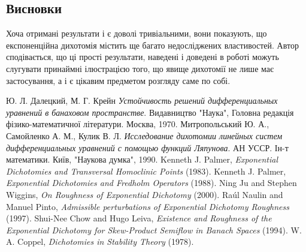 \documentclass{SHVpaper}
\begin{document}
\subsection{Висновки}
Хоча отримані результати і є доволі тривіальними, вони показують, що експоненційна дихотомія містить ще багато недосліджених 
властивостей. Автор сподівається, що ці прості результати, наведені і доведені в роботі можуть слугувати принаймні ілюстрацією того, що
явище дихотомії не лише має застосування, а і є цікавим предметом розгляду саме по собі.
\begin{thebibliography}{9}
Ю. Л. Далецкий, М. Г. Крейн
\emph{Устойчивость решений дифференциальных уравнений в банаховом пространстве}.
Видавництво "Наука"{}, Головна редакція фізико-математичної літератури. Москва, 1970.
Митропольський Ю. А., Самойленко А. М., Кулик В. Л.
\emph{Исследование дихотомии линейных систем дифференциальных уравнений с помощью функций Ляпунова}.
АН УССР. Ін-т математики. Київ, "Наукова думка", 1990.
	Kenneth J. Palmer, {\em Exponential Dichotomies and Transversal Homoclinic Points} (1983).
	Kenneth J. Palmer, {\em Exponential Dichotomies and Fredholm Operators} (1988).
	Ning Ju and Stephen Wiggins, {\em On Roughness of Exponential Dichotomy} (2000).
	Ra\'ul Naulin and Manuel Pinto, {\em Admissible perturbations of Exponential Dichotomy Roughness} (1997).
	Shui-Nee Chow and Hugo Leiva, {\em Existence and Roughness of the Exponential Dichotomy for Skew-Product Semiflow in Banach Spaces} (1994).
	W. A. Coppel, {\em Dichotomies in Stability Theory} (1978).
\end{thebibliography}
\end{document}
